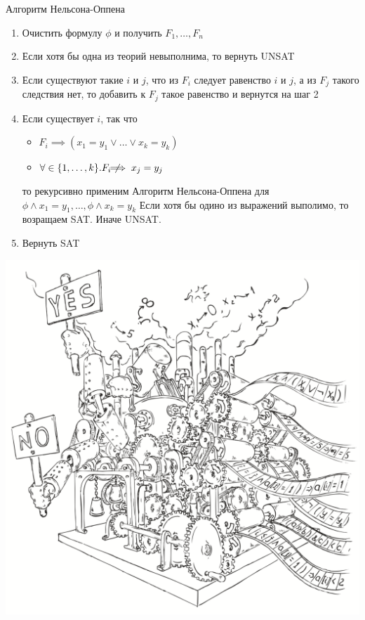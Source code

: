 \documentclass{beamer}
\begin{document}
\begin{frame}{Алгоритм Нельсона-Оппена}
\begin{enumerate}
\item Очистить формулу $\phi$ и получить $F_1, \dots, F_n$
\item Если хотя бы одна из теорий невыполнима, то вернуть UNSAT
\item Если существуют такие $i$ и $j$, что из $F_i$ следует равенство $i$ и $j$, а из $F_j$ такого следствия нет, то добавить к
$F_j$ такое равенство и вернутся на шаг 2
\item Если существует $i$, так что\newline
\begin{itemize}
\item $F_i \implies (x_1 = y_1 \vee \dots \vee x_k = y_k)$
\item $\forall \in \{1, \dots, k\}.F_i \not\!\!\!\!\implies x_j = y_j$
\end{itemize}
то рекурсивно применим Алгоритм Нельсона-Оппена для $\phi \wedge x_1 = y_1, \dots, \phi \wedge x_k = y_k$\newline
Если хотя бы одино из выражений выполимо, то возращаем SAT. Иначе UNSAT.
\item Вернуть SAT
\end{enumerate}
\end{frame}

\begin{frame}
\includegraphics[scale=0.5]{../decision-procedure.png}
\end{frame}
\end{document}
